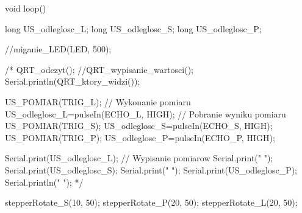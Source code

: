 void loop() {
  long US_odleglosc_L;
  long US_odleglosc_S;
  long US_odleglosc_P;
  
  //miganie_LED(LED, 500);

  /*
  QRT_odczyt();
  //QRT_wypisanie_wartosci();
  Serial.println(QRT_ktory_widzi());

  US_POMIAR(TRIG_L);                    // Wykonanie pomiaru
  US_odleglosc_L=pulseIn(ECHO_L, HIGH); // Pobranie wyniku pomiaru
  US_POMIAR(TRIG_S);
  US_odleglosc_S=pulseIn(ECHO_S, HIGH);
  US_POMIAR(TRIG_P);
  US_odleglosc_P=pulseIn(ECHO_P, HIGH);
  
  Serial.print(US_odleglosc_L);         // Wypisanie pomiarow
  Serial.print(" ");
  Serial.print(US_odleglosc_S);
  Serial.print(" ");
  Serial.print(US_odleglosc_P);
  Serial.println(" ");
  */

  stepperRotate_S(10, 50);
  stepperRotate_P(20, 50);
  stepperRotate_L(20, 50);
}